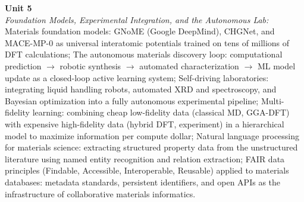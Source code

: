 \noindent\textbf{Unit 5} \\
\textit{Foundation Models, Experimental Integration, and the Autonomous Lab:} Materials foundation models: GNoME (Google DeepMind), CHGNet, and MACE-MP-0 as universal interatomic potentials trained on tens of millions of DFT calculations; The autonomous materials discovery loop: computational prediction $\rightarrow$ robotic synthesis $\rightarrow$ automated characterization $\rightarrow$ ML model update as a closed-loop active learning system; Self-driving laboratories: integrating liquid handling robots, automated XRD and spectroscopy, and Bayesian optimization into a fully autonomous experimental pipeline; Multi-fidelity learning: combining cheap low-fidelity data (classical MD, GGA-DFT) with expensive high-fidelity data (hybrid DFT, experiment) in a hierarchical model to maximize information per compute dollar; Natural language processing for materials science: extracting structured property data from the unstructured literature using named entity recognition and relation extraction; FAIR data principles (Findable, Accessible, Interoperable, Reusable) applied to materials databases: metadata standards, persistent identifiers, and open APIs as the infrastructure of collaborative materials informatics.

\newpage
{}